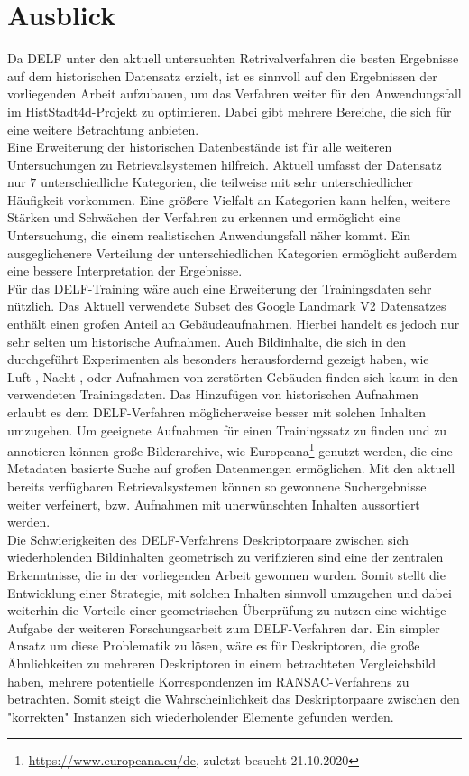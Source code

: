 \section{Ausblick}
Da DELF unter den aktuell untersuchten Retrivalverfahren die besten Ergebnisse auf dem historischen Datensatz erzielt, ist es sinnvoll auf den Ergebnissen der vorliegenden Arbeit aufzubauen, um das Verfahren weiter für den Anwendungsfall im HistStadt4d-Projekt zu optimieren. Dabei gibt mehrere Bereiche, die sich für eine weitere Betrachtung anbieten.
\\
Eine Erweiterung der historischen Datenbestände ist für alle weiteren Untersuchungen zu Retrievalsystemen hilfreich. Aktuell umfasst der Datensatz nur $7$ unterschiedliche Kategorien, die teilweise mit sehr unterschiedlicher Häufigkeit vorkommen. Eine größere Vielfalt an Kategorien kann helfen, weitere Stärken und Schwächen der Verfahren zu erkennen und ermöglicht eine Untersuchung, die einem realistischen Anwendungsfall näher kommt. Ein ausgeglichenere Verteilung der unterschiedlichen Kategorien ermöglicht außerdem eine bessere Interpretation der Ergebnisse.
\\
Für das DELF-Training wäre auch eine Erweiterung der Trainingsdaten sehr nützlich. Das Aktuell verwendete Subset des Google Landmark V2 Datensatzes enthält einen großen Anteil an Gebäudeaufnahmen. Hierbei handelt es jedoch nur sehr selten um historische Aufnahmen. Auch Bildinhalte, die sich in den durchgeführt Experimenten als besonders herausfordernd gezeigt haben, wie Luft-, Nacht-, oder Aufnahmen von zerstörten Gebäuden finden sich kaum in den verwendeten Trainingsdaten. Das Hinzufügen von historischen Aufnahmen erlaubt es dem DELF-Verfahren möglicherweise besser mit solchen Inhalten umzugehen. Um geeignete Aufnahmen für einen Trainingssatz zu finden und zu annotieren können große Bilderarchive, wie Europeana\footnote{\url{https://www.europeana.eu/de}, zuletzt besucht 21.10.2020} genutzt werden, die eine Metadaten basierte Suche auf großen Datenmengen ermöglichen. Mit den aktuell bereits verfügbaren Retrievalsystemen können so gewonnene Suchergebnisse weiter verfeinert, bzw. Aufnahmen mit unerwünschten Inhalten aussortiert werden.
\\
Die Schwierigkeiten des DELF-Verfahrens Deskriptorpaare zwischen sich wiederholenden Bildinhalten geometrisch zu verifizieren sind eine der zentralen Erkenntnisse, die in der vorliegenden Arbeit gewonnen wurden. Somit stellt die Entwicklung einer Strategie, mit solchen Inhalten sinnvoll umzugehen und dabei weiterhin die Vorteile einer geometrischen Überprüfung zu nutzen eine wichtige Aufgabe der weiteren Forschungsarbeit zum DELF-Verfahren dar. Ein simpler Ansatz um diese Problematik zu lösen, wäre es für Deskriptoren, die große Ähnlichkeiten zu mehreren Deskriptoren in einem betrachteten Vergleichsbild haben, mehrere potentielle Korrespondenzen im RANSAC-Verfahrens zu betrachten. Somit steigt die Wahrscheinlichkeit das Deskriptorpaare zwischen den "korrekten" Instanzen sich wiederholender Elemente gefunden werden. 
